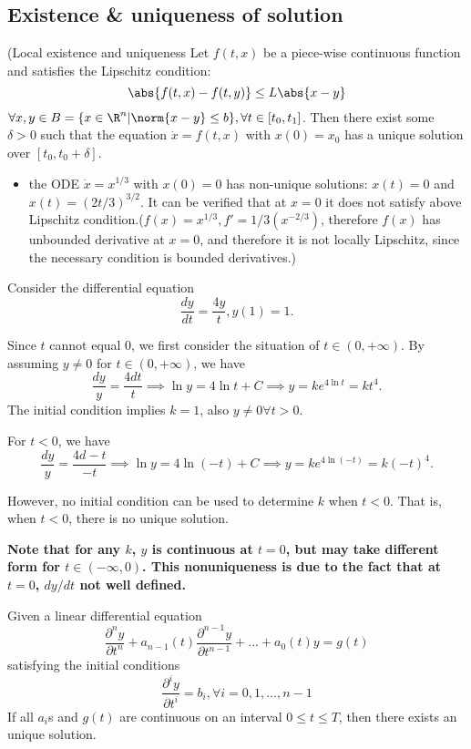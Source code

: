 \begin{refsection}
\subsection{Existence \& uniqueness of solution}
\begin{theorem}
(Local existence and uniqueness \cite[91]{khalil1996nonlinear}
Let $f(t,x)$ be a piece-wise continuous function and satisfies the Lipschitz condition:
$$\abs{f(t,x)-f(t,y)} \leq L\abs{x-y}$$
$\forall x,y\in B=\{x\in \R^n| \norm{x-y} \leq b\},\forall t\in[t_0,t_1]$. Then there exist some $\delta > 0$ such that the equation $\dot{x}=f(t,x)$ with $x(0)=x_0$ has a unique solution over $[t_0,t_0+\delta]$.
\end{theorem}
\begin{example}\hfill
\begin{itemize}
    \item the ODE $\dot{x}=x^{1/3}$ with $x(0)=0$ has non-unique solutions: $x(t) = 0$ and $x(t)=(2t/3)^{3/2}$. It can be verified that at $x=0$ it does not satisfy above Lipschitz condition.($f(x)=x^{1/3},f'=1/3(x^{-2/3})$, therefore $f(x)$ has unbounded derivative at $x=0$, and therefore it is not locally Lipschitz, since the necessary condition is bounded derivatives.)
\end{itemize}
\end{example}


\begin{example}
	Consider the differential equation 
	$$\frac{dy}{dt} = \frac{4y}{t}, y(1) = 1.$$
	
	Since $t$ cannot equal 0, we first consider the situation of $t \in (0,+\infty)$. By assuming $y\neq 0$ for $t\in (0,+\infty)$, we have
	$$\frac{dy}{y} = \frac{4dt}{t} \implies \ln y = 4 \ln t + C \implies y = ke^{4\ln t}=kt^4.$$
	The initial condition implies $k=1$, also $y\neq 0 \forall t > 0$.
	
	For $t < 0$, we have
	$$\frac{dy}{y} = \frac{4d-t}{-t} \implies \ln y = 4 \ln (-t) + C \implies y = ke^{4\ln (-t)}=k(-t)^4.$$
	
	However, no initial condition can be used to determine $k$ when $t < 0$. That is, when $t<0$, there is no unique solution.
	
	\textbf{Note that for any $k$, $y$ is continuous at $t=0$, but may take different form for $t\in (-\infty,0)$. This nonuniqueness is due to the fact that at$t=0$, $dy/dt $ not well defined.}
\end{example}

\begin{theorem}
\cite[40]{luenberger1979introduction} Given a linear differential equation
$$\frac{\partial^n y}{\partial t^n} + a_{n-1}(t)\frac{\partial^{n-1} y}{\partial t^{n-1}} + ... + a_0(t) y = g(t)$$
satisfying the initial conditions 
$$\frac{\partial^i y}{\partial t^i} = b_i, \forall i = 0,1,...,n-1$$
If all $a_i$s and $g(t)$ are continuous on an interval $0 \leq t \leq T$, then there exists an unique solution.
\end{theorem}



\end{refsection}

